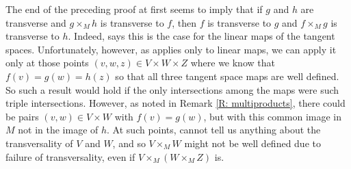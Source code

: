 \begin{remark}
The end of the preceding proof at first seems to imply that if  $g$ and $h$ are transverse and $g\times_M h$ is transverse to $f$, then $f$ is transverse to $g$ and $f\times_Mg$ is transverse to $h$. Indeed,  \cite[Propositions~4-9]{RamBas09} says this is the case for the linear maps of the tangent spaces. Unfortunately, however, as \cite[Propositions~4-9]{RamBas09} applies only to linear maps, we can apply it only at those points $(v,w,z)\in V\times W\times Z$ where we know that $f(v)=g(w)=h(z)$ so that all three tangent space maps are well defined. So such a result would hold if the only intersections among the maps were such triple intersections. However, as noted in Remark \ref{R: multiproducts}, there could be pairs $(v,w)\in V\times W$ with $f(v)=g(w)$, but with this common image in $M$ not in the image of $h$. At such points, \cite[Propositions~4-9]{RamBas09} cannot tell us anything about the transversality of $V$ and $W$, and so $V\times_MW$ might not be well defined due to failure of transversality, even if $V\times_M (W\times_M Z)$ is.
\end{remark}



